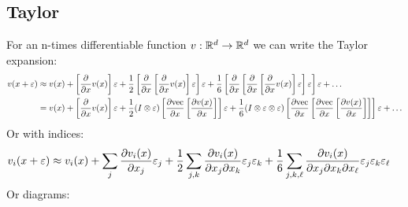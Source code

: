 \subsection{Taylor}
For an n-times differentiable function $v: \mathbb R^d\to\mathbb R^d$ we can write the Taylor expansion:
\begin{align*}
    v(x + \varepsilon)
    &\approx
    v(x)
    + \left[\frac{\partial}{\partial x} v(x)\right]\varepsilon
    + \frac{1}{2}\left[\frac{\partial}{\partial x}\left[\frac{\partial}{\partial x} v(x)\right]\varepsilon\right]\varepsilon
    + \frac{1}{6}\left[\frac{\partial}{\partial x}\left[\frac{\partial}{\partial x} \left[\frac{\partial}{\partial x} v(x)\right]\varepsilon\right]\varepsilon\right]\varepsilon
    + \dots
    \\
    &=
    v(x)
    + \left[\frac{\partial}{\partial x} v(x)\right]\varepsilon
    +
    \frac{1}{2}
    (I \otimes \varepsilon)
    \left[\frac{\partial\mathrm{vec}}{\partial x}\left[\frac{\partial v(x)}{\partial x} \right]\right]\varepsilon
    + \frac{1}{6}
    (I \otimes \varepsilon \otimes \varepsilon)
    \left[\frac{\partial\mathrm{vec}}{\partial x}\left[\frac{\partial\mathrm{vec}}{\partial x} \left[\frac{\partial v(x)}{\partial x} \right]\right]\right]\varepsilon
    + \dots
\end{align*}
Or with indices:
\begin{align*}
    v_i(x + \varepsilon)
    &\approx
    v_i(x)
    + \sum_j \frac{\partial v_i(x)}{\partial x_j} \varepsilon_j
    + \frac12 \sum_{j,k} \frac{\partial v_i(x)}{\partial x_j\partial x_k} \varepsilon_j \varepsilon_k
    + \frac16 \sum_{j,k,\ell} \frac{\partial v_i(x)}{\partial x_j\partial x_k\partial x_\ell} \varepsilon_j \varepsilon_k \varepsilon_\ell
\end{align*}
Or diagrams:
